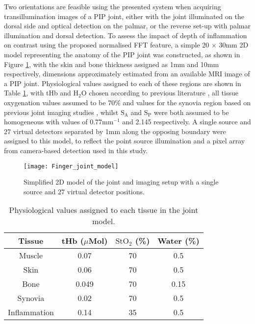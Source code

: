 \documentclass[twoside]{bhamthesis}
\theoremstyle{definition}
\begin{document}
Two orientations are feasible using the presented system when acquiring transillumination images of a PIP joint, either with the joint illuminated on the dorsal side and optical detection on the palmar, or the reverse set-up with palmar illumination and dorsal detection. To assess the impact of depth of inflammation on contrast using the proposed normalised FFT feature, a simple 20 $\times$ 30mm 2D model representing the anatomy of the PIP joint was constructed, as shown in Figure \ref{fig:Finger_joint_model}, with the skin and bone thickness assigned as 1mm and 10mm respectively, dimensions approximately estimated from an available MRI image of a PIP joint. Physiological values assigned to each of these regions are shown in Table \ref{tab:simulation values}, with tHb and $\mathrm{H_2O}$ chosen according to previous literature \cite{alexandrakis2005tomographic}, all tissue oxygenation values assumed to be 70\% and values for the synovia region based on previous joint imaging studies \cite{yuan2010image}, whilst $\mathrm{S_A}$ and $\mathrm{S_P}$ were both assumed to be homogeneous with values of 0.77mm$^{-1}$ and 2.145 respectively. A single source and 27 virtual detectors separated by 1mm along the opposing boundary were assigned to this model, to reflect the point source illumination and a pixel array from camera-based detection used in this study.

\begin{figure}[!ht]
\centering
  \texttt{[image: Finger\_joint\_model]}
\caption{Simplified 2D model of the joint and imaging setup with a single source and 27 virtual detector positions.}
  \label{fig:Finger_joint_model}
\end{figure}

\begin{table}[!ht]
\caption{Physiological values assigned to each tissue in the joint model.} 
\label{tab:simulation values}
\begin{center}       
\begin{tabular}{c c c c}
\hline
\rule[-1ex]{0pt}{3.5ex}  Tissue & tHb ($\mu$Mol) & $\mathrm{StO_2}$ (\%) & Water (\%)\\
\hline
\rule[-1ex]{0pt}{3.5ex}  Muscle & 0.07 & 70 & 0.5\\
\rule[-1ex]{0pt}{3.5ex}  Skin & 0.06 & 70 & 0.5\\
\rule[-1ex]{0pt}{3.5ex}  Bone & 0.049 & 70 & 0.15\\
\rule[-1ex]{0pt}{3.5ex}  Synovia & 0.02 & 70 & 0.5\\
\rule[-1ex]{0pt}{3.5ex}  Inflammation & 0.14 & 35 & 0.5\\
\hline
\end{tabular}
\end{center}
\end{table} 
\end{document}
